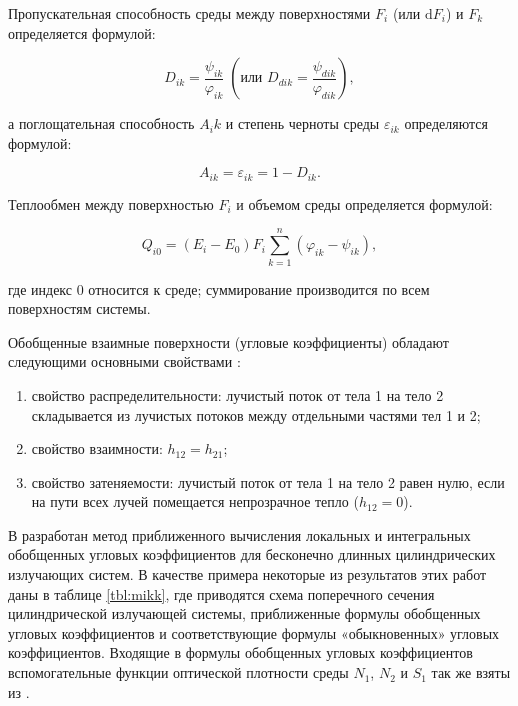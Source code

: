 Пропускательная способность среды между поверхностями $F_i$ (или $\mathrm dF_i$) и $F_k$ определяется формулой:

\begin{equation}
	D_{ik} = \frac{\psi_{ik}}{\varphi_{ik}} \; \left(\text{или } 	D_{dik} = \frac{\psi_{dik}}{\varphi_{dik}}\right),
\end{equation}

\noindent а поглощательная способность $A_ik$ и степень черноты среды $\varepsilon_{ik}$ определяются формулой:

\begin{equation}
	A_{ik} = \varepsilon_{ik} = 1 - D_{ik}.
\end{equation}

Теплообмен между поверхностью $F_i$ и объемом среды определяется формулой:

\begin{equation}
	Q_{i0} = (E_i - E_0) F_i \sum_{k=1}^{n} (\varphi_{ik} - \psi_{ik}),
\end{equation}

\noindent где индекс $0$ относится к среде; суммирование производится по всем поверхностям системы.

Обобщенные взаимные поверхности (угловые коэффициенты) обладают следующими основными свойствами \cite{mikk}:
\begin{enumerate}
	\item свойство распределительности: лучистый поток от тела 1 на тело 2 складывается из лучистых потоков между отдельными частями тел 1 и 2;
	\item свойство взаимности: $h_{12} = h_{21}$;
	\item свойство затеняемости: лучистый поток от тела 1 на тело 2 равен нулю, если на пути всех лучей помещается непрозрачное тепло ($h_{12} = 0$).
\end{enumerate}

В \cite{mikk} разработан метод приближенного вычисления локальных и интегральных обобщенных угловых коэффициентов для бесконечно длинных цилиндрических излучающих систем.
В качестве примера некоторые из результатов этих работ даны в таблице \ref{tbl:mikk}, где приводятся схема поперечного сечения цилиндрической излучающей системы, приближенные формулы обобщенных угловых коэффициентов и соответствующие формулы «обыкновенных» угловых коэффициентов.
Входящие в формулы обобщенных угловых коэффициентов вспомогательные функции оптической плотности среды $N_1$, $N_2$ и $S_1$ так же взяты из \cite{mikk}.

